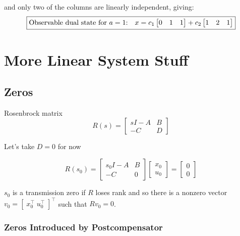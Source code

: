 and only two of the columns are linearly independent, giving:
\begin{equation*}
  \boxed{%
    \text{Observable dual state for $a=1$:}\quad
    x=c_{1}
    \begin{bmatrix}
    0 & 1 & 1
    \end{bmatrix}+
    c_{2}
    \begin{bmatrix}
    1 & 2 & 1
    \end{bmatrix}
  }
\end{equation*}

\section{More Linear System Stuff}

\subsection{Zeros}

Rosenbrock matrix
\begin{equation*}
  R(s)=
  \begin{bmatrix}
    sI-A & B \\
    -C & D
  \end{bmatrix}
\end{equation*}

Let's take $D=0$ for now

\begin{equation*}
  R(s_{0})=
  \begin{bmatrix}
    s_{0}I-A & B \\
    -C & 0
  \end{bmatrix}
  \begin{bmatrix}
    x_{0} \\
    u_{0}
  \end{bmatrix}
  =
  \begin{bmatrix}
    0 \\
    0
  \end{bmatrix}
\end{equation*}

$s_{0}$ is a transmission zero if $R$ loses rank and so there is a nonzero vector $v_{0}=[\;x_{0}^{\top}\;u_{0}^{\top}\;]^{\top}$ such that $Rv_{0}=0$.

\subsubsection{Zeros Introduced by Postcompensator}


